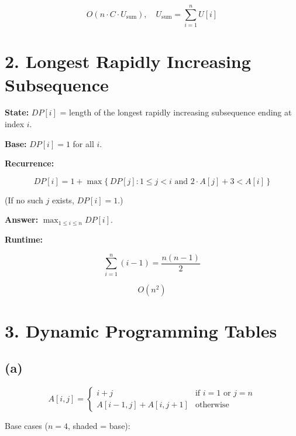 \documentclass[11pt]{article}
\begin{document}
\[
\boxed{O(n \cdot C \cdot U_{\mathrm{sum}}), \quad U_{\mathrm{sum}} = \textstyle\sum_{i=1}^{n} U[i]}
\]


\section*{2. Longest Rapidly Increasing Subsequence}

\textbf{State:}
$DP[i]$ = length of the longest rapidly increasing subsequence ending at index $i$.

\textbf{Base:}
$DP[i] = 1$ for all $i$.

\textbf{Recurrence:}

\[
DP[i] = 1 + \max\!\big\{\, DP[j] : 1 \le j < i \text{ and } 2 \cdot A[j] + 3 < A[i] \,\big\}
\]

(If no such $j$ exists, $DP[i] = 1$.)

\textbf{Answer:} $\max_{1 \le i \le n} DP[i]$.

\begin{algorithm}[H]
\DontPrintSemicolon
{}
\end{algorithm}

\textbf{Runtime:}

\[
\sum_{i=1}^{n}(i-1) = \frac{n(n-1)}{2}
\]

\[
\boxed{O(n^2)}
\]


\section*{3. Dynamic Programming Tables}

\subsection*{(a)}

\[
A[i,j] = \begin{cases}
i + j & \text{if } i = 1 \text{ or } j = n \\
A[i{-}1, j] + A[i, j{+}1] & \text{otherwise}
\end{cases}
\]

Base cases ($n = 4$, \colorbox{gray!20}{shaded} = base):
\end{document}
